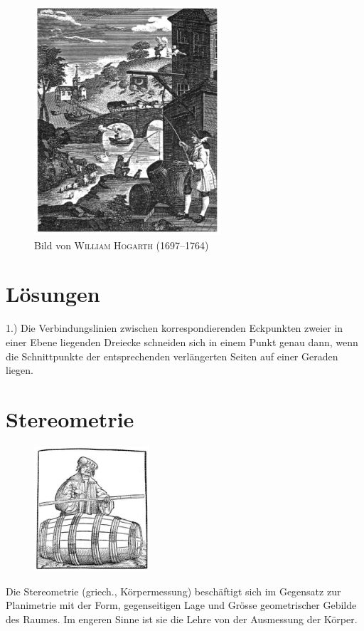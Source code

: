 \documentclass[%
11pt,%
twoside,%
titlepage,%
a4page,%
german,%
headsepline%
]{scrartcl}
\begin{document}
\begin{figure}[h!]
\begin{center}
\includegraphics[width=0.618\textwidth]{pictures/hogarth}
\caption{Bild von \textsc{William Hogarth} (1697--1764)}
\end{center}
\end{figure}

\vfill

\section*{L\"osungen}

1.) Die Verbindungslinien zwischen korrespondierenden Eckpunkten zweier in einer Ebene liegenden Dreiecke schneiden sich in einem Punkt genau dann, wenn die Schnittpunkte der entsprechenden verl\"angerten Seiten auf einer Geraden liegen.

\clearpage

\section{Stereometrie}
\begin{figure}
  \begin{center}
    \includegraphics[width=0.382\textwidth]{pictures/fass}
  \end{center}
\end{figure}
Die Stereometrie (griech., K\"orpermessung) besch\"aftigt
sich im Gegensatz zur Planimetrie mit der Form, gegenseitigen Lage und Gr\"osse geometrischer Gebilde des Raumes. Im engeren Sinne ist sie die Lehre von der Ausmessung der K\"orper.
\end{document}
